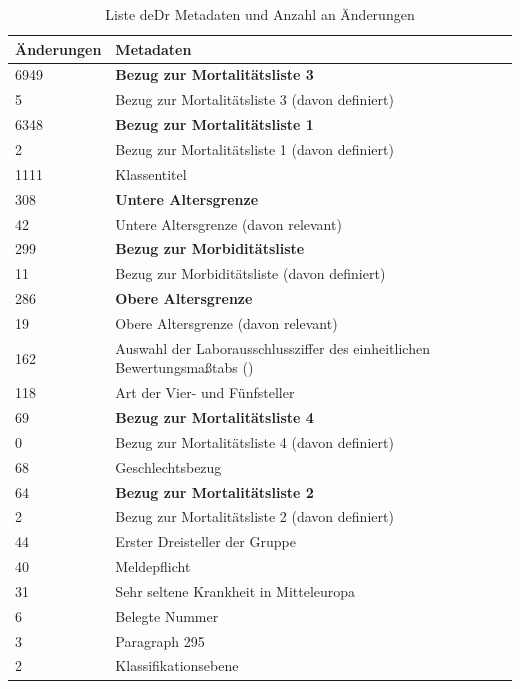 \begin{table}[ht]
	\centering
	\small
	\caption[Änderungen in den Metadaten]{Liste deDr Metadaten und Anzahl an Änderungen}
	\label{tab:icdupd}
	\begin{tabular}{|l|p{12cm}|}
		\hline
		\rowcolor{lightgray} Änderungen & Metadaten \\ \hline
		6949 & \textbf{Bezug zur Mortalitätsliste 3} \\ \hline		
		5 & Bezug zur Mortalitätsliste 3 (davon definiert) \\ \hline
		6348 & \textbf{Bezug zur Mortalitätsliste 1} \\ \hline
		2 & Bezug zur Mortalitätsliste 1 (davon definiert) \\ \hline
		1111 & Klassentitel \\ \hline
		308 & \textbf{Untere Altersgrenze} \\ \hline
		42 & Untere Altersgrenze (davon relevant) \\ \hline
		299 & \textbf{Bezug zur Morbiditätsliste} \\ \hline
		11 & Bezug zur Morbiditätsliste (davon definiert) \\ \hline
		286 & \textbf{Obere Altersgrenze} \\ \hline
		19 & Obere Altersgrenze (davon relevant) \\ \hline
		162 & Auswahl der Laborausschlussziffer des einheitlichen Bewertungsmaßtabs (\acsu{ebm})  \\ \hline
		118 & Art der Vier- und Fünfsteller \\ \hline
		69 & \textbf{Bezug zur Mortalitätsliste 4} \\ \hline
		0 & Bezug zur Mortalitätsliste 4 (davon definiert) \\ \hline
		68 & Geschlechtsbezug \\ \hline
		64 & \textbf{Bezug zur Mortalitätsliste 2} \\ \hline
		2 & Bezug zur Mortalitätsliste 2 (davon definiert) \\ \hline
		44 & Erster Dreisteller der Gruppe \\ \hline		
		40 & Meldepflicht \\ \hline
		31 & Sehr seltene Krankheit in Mitteleuropa \\ \hline				
		6 & Belegte Nummer \\ \hline
		3 & Paragraph 295 \\ \hline			
		2 & Klassifikationsebene \\ \hline
	\end{tabular}
\end{table}

